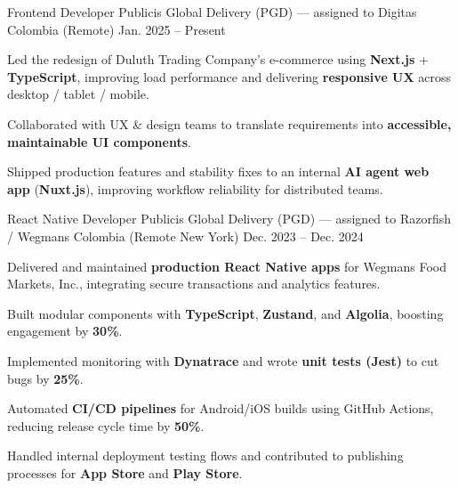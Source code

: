 
\begin{cventries}

  \cventry
  {Frontend Developer}
  {Publicis Global Delivery (PGD) — assigned to Digitas}
  {Colombia (Remote)}
  {Jan. 2025 -- Present}
  {
    \begin{cvitems}
      \item {Led the redesign of Duluth Trading Company's e-commerce using \textbf{Next.js} + \textbf{TypeScript}, improving load performance and delivering \textbf{responsive UX} across desktop / tablet / mobile.}
      \item {Collaborated with UX \& design teams to translate requirements into \textbf{accessible, maintainable UI components}.}
      \item {Shipped production features and stability fixes to an internal \textbf{AI agent web app} (\textbf{Nuxt.js}), improving workflow reliability for distributed teams.}
    \end{cvitems}
  }

  \cventry
  {React Native Developer}
  {Publicis Global Delivery (PGD) — assigned to Razorfish / Wegmans}
  {Colombia (Remote \textemdash{} New York)}
  {Dec. 2023 -- Dec. 2024}
  {
    \begin{cvitems}
      \item {Delivered and maintained \textbf{production React Native apps} for Wegmans Food Markets, Inc., integrating secure transactions and analytics features.}
      \item {Built modular components with \textbf{TypeScript}, \textbf{Zustand}, and \textbf{Algolia}, boosting engagement by \textbf{30\%}.}
      \item {Implemented monitoring with \textbf{Dynatrace} and wrote \textbf{unit tests (Jest)} to cut bugs by \textbf{25\%}.}
      \item {Automated \textbf{CI/CD pipelines} for Android/iOS builds using GitHub Actions, reducing release cycle time by \textbf{50\%}.}
      \item {Handled internal deployment testing flows and contributed to publishing processes for \textbf{App Store} and \textbf{Play Store}.}
    \end{cvitems}
  }


\end{cventries}
